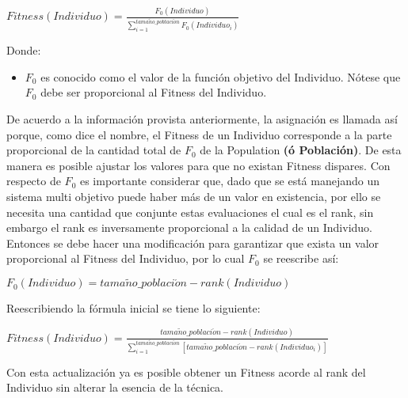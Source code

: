 \documentclass[class=report, crop=false]{standalone}
\begin{document}
\begin{center}\(Fitness(Individuo) = \frac{F_0(Individuo)}{\sum_{i=1}^{tama\tilde{n}o\_poblaci\acute{o}n}F_0(Individuo_i)}\)
\end{center}

Donde:

\begin{itemize}
\item \(F_0\) es conocido como el valor de la función objetivo del Individuo. Nótese que \(F_0\) debe ser proporcional al Fitness del Individuo.
\end{itemize}

De acuerdo a la información provista anteriormente, la asignación 
es llamada así porque, como dice el nombre, el Fitness de un Individuo 
corresponde a la parte proporcional de la cantidad total de \(F_0\) de 
la Population \textbf{(ó Población)}.\break
De esta manera es posible ajustar los valores para que no existan 
Fitness dispares. Con respecto de \(F_0\) es importante considerar 
que, dado que se está manejando un sistema multi objetivo puede haber 
más de un valor en existencia,  por ello se necesita una cantidad que 
conjunte estas evaluaciones el cual es el rank, sin embargo el rank 
es inversamente proporcional a la calidad de un Individuo.\break
Entonces se debe hacer una modificación para garantizar que exista un valor
proporcional al Fitness del Individuo, por lo cual \(F_0\) se reescribe así:

\begin{center}\(F_0(Individuo) = tama\tilde{n}o\_poblaci\acute{o}n - rank(Individuo)\)
\end{center}

Reescribiendo la fórmula inicial se tiene lo siguiente:

\begin{center}\(Fitness(Individuo) = \frac{tama\tilde{n}o\_poblaci\acute{o}n - rank(Individuo)}{\sum_{i=1}^{tama\tilde{n}o\_poblaci\acute{o}n}[tama\tilde{n}o\_poblaci\acute{o}n - rank(Individuo_i)]}\)
\end{center}

Con esta actualización ya es posible obtener un Fitness acorde al 
rank del Individuo sin alterar la esencia de la técnica.


\end{document}
